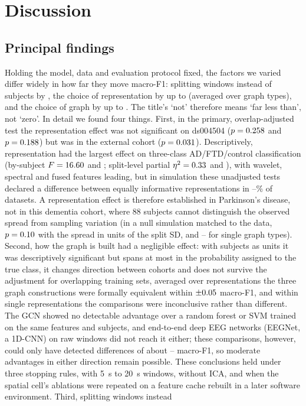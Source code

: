 \section{Discussion}\label{sec:discussion}

\subsection{Principal findings}
Holding the model, data and evaluation protocol fixed, the factors we varied differ widely in how far
they move macro-F1: splitting windows instead of subjects by \leakGain{}, the choice of
representation by up to \obsRepRange{} (averaged over graph types), and the choice of graph by up to
\obsEdgeRange{}. The title's `not' therefore means `far less than', not `zero'. In detail we found four things. First, in the primary,
overlap-adjusted test the representation effect was not significant on ds004504 ($p=0.258$ and
$p=0.188$) but was in the external cohort ($p=0.031$). Descriptively, representation had the
largest effect on three-class AD/FTD/control classification (by-subject $F=16.60$ and \mixConfRepF{};
split-level partial $\eta^2=0.33$ and \canovaRepEta{}), with wavelet, spectral and fused features
leading, but in simulation these unadjusted tests declared a difference between equally informative
representations in \simCorrSubjLo--\simNullUncorr\% of datasets. A representation effect is therefore established in Parkinson's disease, not
in this dementia cohort, where 88 subjects cannot distinguish the observed spread from sampling variation
(in a null simulation matched to the data, $p=0.10$ with the spread in units of the split SD, and \calEdgeStdPLo--\calEdgeStdPHi{} for single graph types).
Second, how the graph is built had a negligible effect: with subjects as units it was descriptively significant but spans at most \mixSelEdgeRange{} in the probability assigned to the true class,
it changes direction between cohorts and does not survive the adjustment for overlapping training sets,
averaged over representations the three graph constructions were formally equivalent within
$\pm0.05$ macro-F1, and within single representations the comparisons were inconclusive rather than
different. The GCN showed no detectable advantage over a random forest or SVM trained
on the same features and subjects, and end-to-end deep EEG networks (EEGNet, a 1D-CNN) on raw windows
did not reach it either; these comparisons, however, could only have detected differences of about
\eqGvcMde{}--\eqDeepMde{} macro-F1, so moderate advantages in either direction remain possible. These conclusions held under three stopping rules, with \SI{5}{\second} to \SI{20}{\second} windows, without ICA, and when the spatial cell's ablations were repeated on a feature cache rebuilt in a later software environment. Third, splitting windows instead
